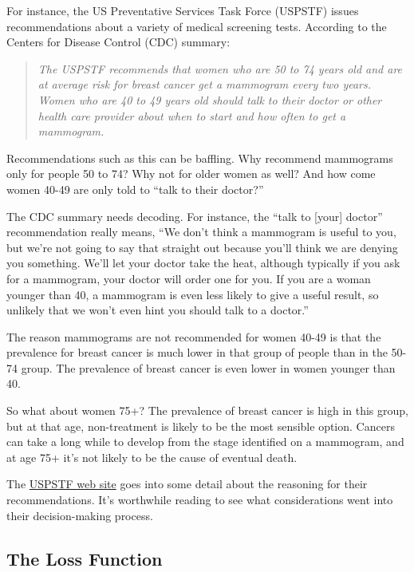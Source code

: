 \documentclass[
  letterpaper,
  DIV=11,
  numbers=noendperiod,
  oneside]{scrreprt}
\begin{document}
For instance, the US Preventative Services Task Force (USPSTF) issues
recommendations about a variety of medical screening tests. According to
the Centers for Disease Control (CDC) summary:

\begin{quote}
\emph{The USPSTF recommends that women who are 50 to 74 years old and
are at average risk for breast cancer get a mammogram every two years.
Women who are 40 to 49 years old should talk to their doctor or other
health care provider about when to start and how often to get a
mammogram.}
\end{quote}

Recommendations such as this can be baffling. Why recommend mammograms
only for people 50 to 74? Why not for older women as well? And how come
women 40-49 are only told to ``talk to their doctor?''

The CDC summary needs decoding. For instance, the ``talk to {[}your{]}
doctor'' recommendation really means, ``We don't think a mammogram is
useful to you, but we're not going to say that straight out because
you'll think we are denying you something. We'll let your doctor take
the heat, although typically if you ask for a mammogram, your doctor
will order one for you. If you are a woman younger than 40, a mammogram
is even less likely to give a useful result, so unlikely that we won't
even hint you should talk to a doctor.''

The reason mammograms are not recommended for women 40-49 is that the
prevalence for breast cancer is much lower in that group of people than
in the 50-74 group. The prevalence of breast cancer is even lower in
women younger than 40.

So what about women 75+? The prevalence of breast cancer is high in this
group, but at that age, non-treatment is likely to be the most sensible
option. Cancers can take a long while to develop from the stage
identified on a mammogram, and at age 75+ it's not likely to be the
cause of eventual death.

The
\href{https://www.uspreventiveservicestaskforce.org/uspstf/recommendation/breast-cancer-screening}{USPSTF
web site} goes into some detail about the reasoning for their
recommendations. It's worthwhile reading to see what considerations went
into their decision-making process.

\hypertarget{the-loss-function}{%
\subsection{The Loss Function}\label{the-loss-function}}
\end{document}
